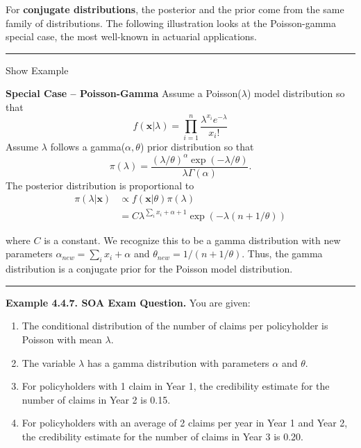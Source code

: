 \documentclass[]{book}
\providecommand{\tightlist}{%
  \setlength{\itemsep}{0pt}\setlength{\parskip}{0pt}}
\theoremstyle{definition}
\theoremstyle{definition}
\theoremstyle{definition}
\theoremstyle{remark}
\begin{document}
For \textbf{conjugate distributions}, the posterior and the prior come
from the same family of distributions. The following illustration looks
at the Poisson-gamma special case, the most well-known in actuarial
applications.

\begin{center}\rule{0.5\linewidth}{\linethickness}\end{center}

Show Example

\hypertarget{toggleExampleConj}{}
\textbf{Special Case -- Poisson-Gamma} Assume a Poisson(\(\lambda\))
model distribution so that
\[f(\mathbf{x} | \lambda) = \prod_{i=1}^n \frac{\lambda^{x_i} e^{-\lambda}}{x_i!}\]
Assume \(\lambda\) follows a gamma(\(\alpha, \theta\)) prior
distribution so that
\[\pi(\lambda) = \frac{\left(\lambda/\theta\right)^{\alpha} \exp(-\lambda/\theta)}{\lambda \Gamma(\alpha)}.\]
The posterior distribution is proportional to \[\begin{aligned}
\pi(\lambda | \mathbf{x}) &\propto f(\mathbf{x}|\theta ) \pi(\lambda) \\
&= C \lambda^{\sum_i x_i + \alpha +1} \exp(-\lambda(n+1/\theta))
\end{aligned}\]

where \(C\) is a constant. We recognize this to be a gamma distribution
with new parameters \(\alpha_{new} = \sum_i x_i + \alpha\) and
\(\theta_{new} = 1/(n + 1/\theta)\). Thus, the gamma distribution is a
conjugate prior for the Poisson model distribution.

\begin{center}\rule{0.5\linewidth}{\linethickness}\end{center}

\textbf{Example 4.4.7. SOA Exam Question.} You are given:

\begin{enumerate}
\def\labelenumi{(\roman{enumi})}
\tightlist
\item
  The conditional distribution of the number of claims per policyholder
  is Poisson with mean \(\lambda\).
\item
  The variable \(\lambda\) has a gamma distribution with parameters
  \(\alpha\) and \(\theta\).
\item
  For policyholders with 1 claim in Year 1, the credibility estimate for
  the number of claims in Year 2 is 0.15.
\item
  For policyholders with an average of 2 claims per year in Year 1 and
  Year 2, the credibility estimate for the number of claims in Year 3 is
  0.20.
\end{enumerate}
\end{document}
